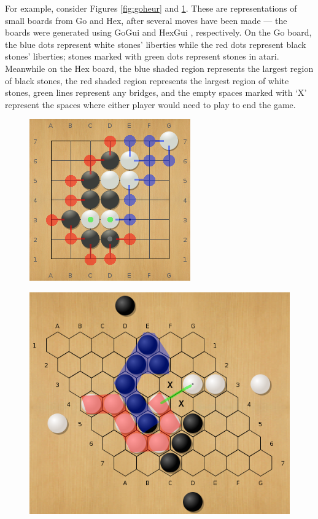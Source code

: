 For example, consider Figures \ref{fig:goheur} and \ref{fig:hexheur}.  These are representations of small boards from Go and Hex, after several moves have been made --- the boards were generated using GoGui \cite{fuego} and HexGui \cite{benzene}, respectively.  On the Go board, the blue dots represent white stones' liberties while the red dots represent black stones' liberties; stones marked with green dots represent stones in atari.  Meanwhile on the Hex board, the blue shaded region represents the largest region of black stones, the red shaded region represents the largest region of white stones, green lines represent any bridges, and the empty spaces marked with `X' represent the spaces where either player would need to play to end the game.

\begin{figure}[h]
\centering
\begin{minipage}{.5\textwidth}
  \centering
  \includegraphics[scale=0.65]{images/goheuredited.png}
  \label{fig:goheur}
\end{minipage}%
\begin{minipage}{.5\textwidth}
  \centering
  \includegraphics[scale=0.375]{images/hexheuredited.png}
  \label{fig:hexheur}
\end{minipage}
\end{figure}


